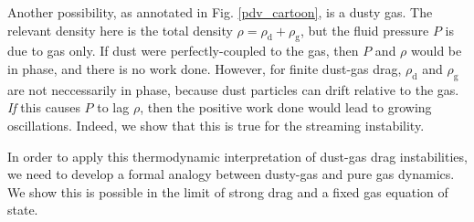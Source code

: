 \documentclass[iop, numberedappendix]{emulateapj}
\newcommand{\rhod}{\rho_\mathrm{d}}
\newcommand{\rhog}{\rho_\mathrm{g}}
\begin{document}

Another possibility, as annotated in Fig. \ref{pdv_cartoon}, is a dusty gas. The
relevant density here is the total density $\rho = \rhod + \rhog$, 
but the fluid pressure $P$ is due to gas only. If dust were 
perfectly-coupled to the gas, then $P$ and $\rho$ would be in phase, 
and there is no work done. However, for finite dust-gas drag, $\rhod$ and
$\rhog$ are not neccessarily in phase, because dust particles can
drift relative to the gas.   
\emph{If} this causes $P$ to lag 
$\rho$, then the positive work done would lead to growing
oscillations. Indeed, we show that this is true for the streaming
instability. 

In order to apply this thermodynamic interpretation of dust-gas drag
instabilities, we need to develop a formal analogy between dusty-gas
and pure gas dynamics. We show this is possible in the limit of
strong drag and a fixed gas equation of state. 







\appendix




\end{document}
